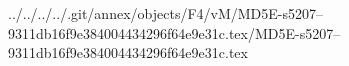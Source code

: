 ../../../../.git/annex/objects/F4/vM/MD5E-s5207--9311db16f9e384004434296f64e9e31c.tex/MD5E-s5207--9311db16f9e384004434296f64e9e31c.tex